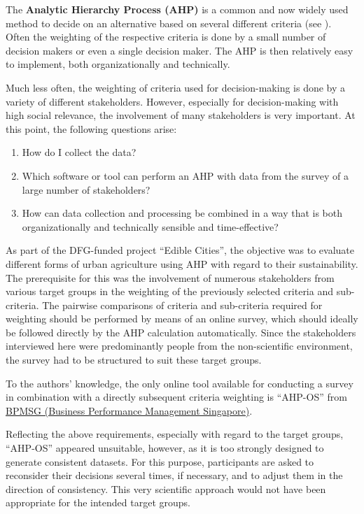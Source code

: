 \documentclass [oneside,10pt,a4paper,ngerman,BCOR10mm,headsepline,parindent,final]{scrartcl}
\providecommand{\tightlist}{%
      \setlength{\itemsep}{0pt}\setlength{\parskip}{0pt}}
\begin{document}
The \textbf{Analytic Hierarchy Process (AHP)} is a common and now widely
used method to decide on an alternative based on several different
criteria (see \cite{Wikipedia_AHP}). Often the weighting of the
respective criteria is done by a small number of decision makers or even
a single decision maker. The AHP is then relatively easy to implement,
both organizationally and technically.

Much less often, the weighting of criteria used for decision-making is
done by a variety of different stakeholders. However, especially for
decision-making with high social relevance, the involvement of many
stakeholders is very important. At this point, the following questions
arise:

\begin{enumerate}
\def\labelenumi{\arabic{enumi}.}
\tightlist
\item
  How do I collect the data?
\item
  Which software or tool can perform an AHP with data from the survey of
  a large number of stakeholders?
\item
  How can data collection and processing be combined in a way that is
  both organizationally and technically sensible and time-effective?
\end{enumerate}

As part of the DFG-funded project ``Edible Cities'', the objective was
to evaluate different forms of urban agriculture using AHP with regard
to their sustainability. The prerequisite for this was the involvement
of numerous stakeholders from various target groups in the weighting of
the previously selected criteria and sub-criteria. The pairwise
comparisons of criteria and sub-criteria required for weighting should
be performed by means of an online survey, which should ideally be
followed directly by the AHP calculation automatically. Since the
stakeholders interviewed here were predominantly people from the
non-scientific environment, the survey had to be structured to suit
these target groups.

To the authors' knowledge, the only online tool available for conducting
a survey in combination with a directly subsequent criteria weighting is
``AHP-OS'' from \href{https://bpmsg.com}{BPMSG (Business Performance
Management Singapore)}.

Reflecting the above requirements, especially with regard to the target
groups, ``AHP-OS'' appeared unsuitable, however, as it is too strongly
designed to generate consistent datasets. For this purpose, participants
are asked to reconsider their decisions several times, if necessary, and
to adjust them in the direction of consistency. This very scientific
approach would not have been appropriate for the intended target groups.
\end{document}
